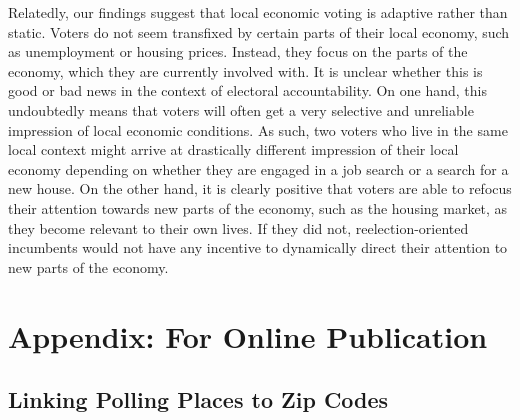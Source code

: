 \documentclass[12pt,a4paper]{article}
\begin{document}
	Relatedly, our findings suggest that local economic voting is adaptive rather than static. Voters do not seem transfixed by certain parts of their local economy, such as unemployment or housing prices. Instead, they focus on the parts of the economy, which they are currently involved with. It is unclear whether this is good or bad news in the context of electoral accountability. On one hand, this undoubtedly means that voters will often get a very selective and unreliable impression of local economic conditions. As such, two voters who live in the same local context might arrive at drastically different impression of their local economy depending on whether they are engaged in a job search or a search for a new house.  On the other hand, it is clearly positive that voters are able to refocus their attention towards new parts of the economy, such as the housing market, as they become relevant to their own lives. If they did not, reelection-oriented incumbents would not have any incentive to dynamically direct their attention to new parts of the economy.
	
	
	
	\clearpage
	
	\singlespacing
	
	
	
	
	\newpage
	
	\appendix
	\section*{Appendix: For Online Publication}
	\onehalfspacing
	\renewcommand{\thesubsection}{\Alph{subsection}}
	\renewcommand{\thetable}{\Alph{subsection}\arabic{table}}
	\renewcommand{\thefigure}{\Alph{subsection}\arabic{figure}}
	
	\localtableofcontents
	
	
	\newpage
	
	\subsection{Linking Polling Places to Zip Codes}\label{app_linking}
	
\end{document}
